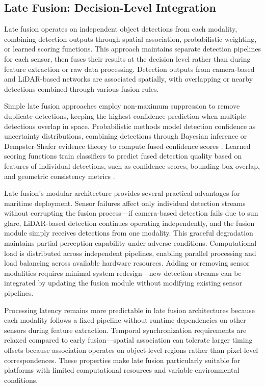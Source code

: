 \documentclass[../main.tex]{subfiles}
\begin{document}
\subsection{Late Fusion: Decision-Level Integration}

Late fusion operates on independent object detections from each modality, combining detection outputs through spatial association, probabilistic weighting, or learned scoring functions. This approach maintains separate detection pipelines for each sensor, then fuses their results at the decision level rather than during feature extraction or raw data processing. Detection outputs from camera-based and LiDAR-based networks are associated spatially, with overlapping or nearby detections combined through various fusion rules.

Simple late fusion approaches employ non-maximum suppression to remove duplicate detections, keeping the highest-confidence prediction when multiple detections overlap in space. Probabilistic methods model detection confidence as uncertainty distributions, combining detections through Bayesian inference or Dempster-Shafer evidence theory to compute fused confidence scores \cite{wang2020a}. Learned scoring functions train classifiers to predict fused detection quality based on features of individual detections, such as confidence scores, bounding box overlap, and geometric consistency metrics \cite{pang2020}.

Late fusion's modular architecture provides several practical advantages for maritime deployment. Sensor failures affect only individual detection streams without corrupting the fusion process—if camera-based detection fails due to sun glare, LiDAR-based detection continues operating independently, and the fusion module simply receives detections from one modality. This graceful degradation maintains partial perception capability under adverse conditions. Computational load is distributed across independent pipelines, enabling parallel processing and load balancing across available hardware resources. Adding or removing sensor modalities requires minimal system redesign—new detection streams can be integrated by updating the fusion module without modifying existing sensor pipelines.

Processing latency remains more predictable in late fusion architectures because each modality follows a fixed pipeline without runtime dependencies on other sensors during feature extraction. Temporal synchronization requirements are relaxed compared to early fusion—spatial association can tolerate larger timing offsets because association operates on object-level regions rather than pixel-level correspondences. These properties make late fusion particularly suitable for platforms with limited computational resources and variable environmental conditions.
\end{document}

